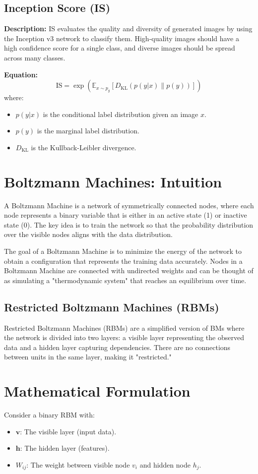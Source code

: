 \documentclass{article}
\begin{document}
\subsection{Inception Score (IS)}
\textbf{Description:} IS evaluates the quality and diversity of generated images by using the Inception v3 network to classify them. High-quality images should have a high confidence score for a single class, and diverse images should be spread across many classes.

\textbf{Equation:}
\[
\text{IS} = \exp \left( \mathbb{E}_{x \sim p_g} \left[ D_{\text{KL}}(p(y|x) \| p(y)) \right] \right)
\]
where:
\begin{itemize}
    \item \(p(y|x)\) is the conditional label distribution given an image \(x\).
    \item \(p(y)\) is the marginal label distribution.
    \item \(D_{\text{KL}}\) is the Kullback-Leibler divergence.
  \end{itemize}

\newpage
\section{Boltzmann Machines: Intuition}
A Boltzmann Machine is a network of symmetrically connected nodes, where each node represents a binary variable that is either in an active state (1) or inactive state (0). The key idea is to train the network so that the probability distribution over the visible nodes aligns with the data distribution.

The goal of a Boltzmann Machine is to minimize the energy of the network to obtain a configuration that represents the training data accurately. Nodes in a Boltzmann Machine are connected with undirected weights and can be thought of as simulating a "thermodynamic system" that reaches an equilibrium over time.

\subsection{Restricted Boltzmann Machines (RBMs)}
Restricted Boltzmann Machines (RBMs) are a simplified version of BMs where the network is divided into two layers: a visible layer representing the observed data and a hidden layer capturing dependencies. There are no connections between units in the same layer, making it "restricted."

\section{Mathematical Formulation}
Consider a binary RBM with:
\begin{itemize}
    \item \( \mathbf{v} \): The visible layer (input data).
    \item \( \mathbf{h} \): The hidden layer (features).
    \item \( W_{ij} \): The weight between visible node \( v_i \) and hidden node \( h_j \).
\end{itemize}
\end{document}
